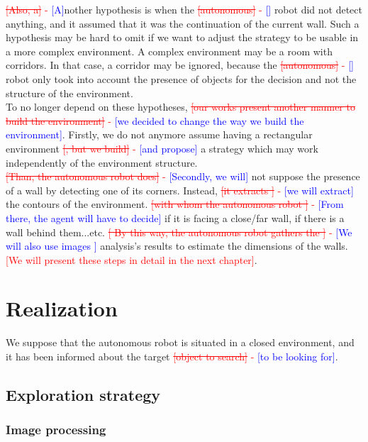 \documentclass[12pt]{report}
\newcommand{\hcr}[2]{\textcolor{red}{\sout{[#1]} - \textcolor{blue}{ [#2]}}}
\newcommand{\hc}[1]{\textcolor{red}{[#1]}}
\begin{document}
	\hcr{Also, a}{A}nother hypothesis is when the \hcr{autonomous}{} robot did not detect anything, and it assumed 
that it was the continuation of the current wall. Such a hypothesis may be hard to omit if we want to adjust the 
strategy to be usable in a more complex environment. A complex environment may be a room with corridors. In that case, a 
corridor may be ignored, because the \hcr{autonomous}{} robot only took into account the presence of objects for the 
decision and not the structure of the environment.\\
	
	To no longer depend on these hypotheses, \hcr{our works 
present another manner to build the environment}{we decided to change the way we build the environment}. Firstly, we do 
not anymore assume having a rectangular environment \hcr{, but we build}{and propose}  a strategy which may work 
independently of the environment structure.\\
\hcr{Than, the autonomous robot does}{Secondly, we will} not suppose the 
presence of a wall by detecting one of its corners. Instead, \hcr{it extracts }{we will extract} the contours of the 
environment. \hcr{with whom the autonomous robot }{From there, the agent will have to decide} if it is facing a 
close/far wall, if there is a wall behind them...etc. \hcr{	By this way, the autonomous robot gathers the }{We will 
also use images } analysis's results to estimate the dimensions of the walls.\hc{We will present these steps in detail 
in the next chapter}.
	
    \chapter{Realization}
    \label{chap:realization}
    
    We suppose that the autonomous robot is situated in a closed environment, and it has been informed about the target 
\hcr{object to search}{to be looking for}. 


	\section{Exploration strategy}
	 \subsection{Image processing}
\end{document}
